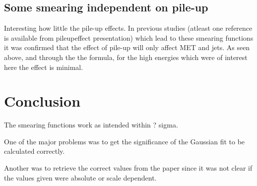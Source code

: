 \subsection{Some smearing independent on pile-up}
Interesting how little the pile-up effects. In previous studies (atleast one reference is available from pileupeffect presentation) which lead to these smearing functions it was confirmed that the effect of pile-up will only affect MET and jets. As seen above, and through the the formula, for the high energies which were of interest here the effect is minimal. 


\section{Conclusion}
The smearing functions work as intended within ? sigma. 

One of the major problems was to get the significance of the Gaussian fit to be calculated correctly.

Another was to retrieve the correct values from the paper since it was not clear if the values given were absolute or scale dependent.